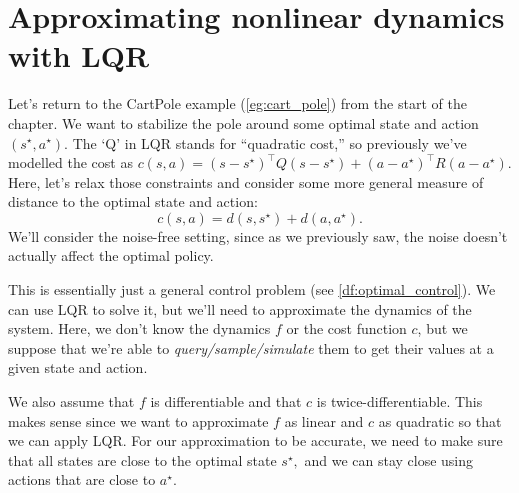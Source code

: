 \documentclass[../main/main]{subfiles}
\begin{document}
\section{Approximating nonlinear dynamics with LQR}

Let's return to the CartPole example (\ref{eg:cart_pole}) from the start of the chapter. We want to stabilize the pole around some
optimal state and action $(s^\star, a^\star).$
The `Q' in LQR stands for ``quadratic cost,'' so previously
we've modelled the cost as $c(s, a) = (s - s^\star)^\top Q (s - s^\star) + (a - a^\star)^\top R (a - a^\star).$
Here, let's relax those constraints and consider some more
general measure of distance to the optimal state and action: \[
    c(s, a) = d(s, s^\star) + d(a, a^\star).
\]
We'll consider the noise-free setting, since as we previously saw,
the noise doesn't actually affect the optimal policy.

This is essentially just a general control problem (see \ref{df:optimal_control}). We can use LQR to solve it, but we'll need to approximate the dynamics of the system.
Here, we don't know the dynamics $f$ or the cost function $c$,
but we suppose that we're able to \emph{query/sample/simulate} them
to get their values at a given state and action.

We also assume that $f$ is differentiable and that $c$ is twice-differentiable. This makes sense since we want to approximate
$f$ as linear and $c$ as quadratic so that we can apply LQR.
For our approximation to be accurate, we need to make sure that all states are close to the optimal state $s^\star,$
and we can stay close using actions that are close to $a^\star.$

\end{document}

